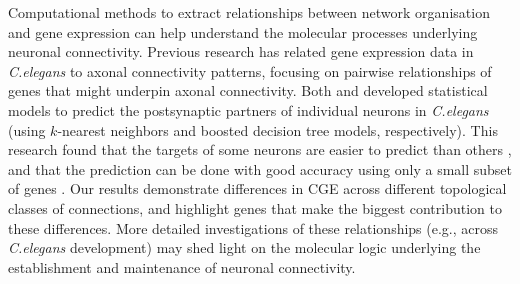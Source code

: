 {Computational methods to extract relationships between network organisation and gene expression can help understand the molecular processes underlying neuronal connectivity.
Previous research has related gene expression data in \textit{C.elegans} to axonal connectivity patterns, focusing on pairwise relationships of genes that might underpin axonal connectivity.
Both \mbox{\citet{Kaufman2006}} and \mbox{\citet{Baruch2008}} developed statistical models to predict the postsynaptic partners of individual neurons in \textit{C.elegans} (using $k$-nearest neighbors and boosted decision tree models, respectively).
This research found that the targets of some neurons are easier to predict than others \mbox{\citep{Kaufman2006}}, and that the prediction can be done with good accuracy using only a small subset of genes \citep{Baruch2008}.
Our results demonstrate differences in CGE across different topological classes of connections, and highlight genes that make the biggest contribution to these differences.
More detailed investigations of these relationships (e.g., across \textit{C.elegans} development) may shed light on the molecular logic underlying the establishment and maintenance of neuronal connectivity.

}

